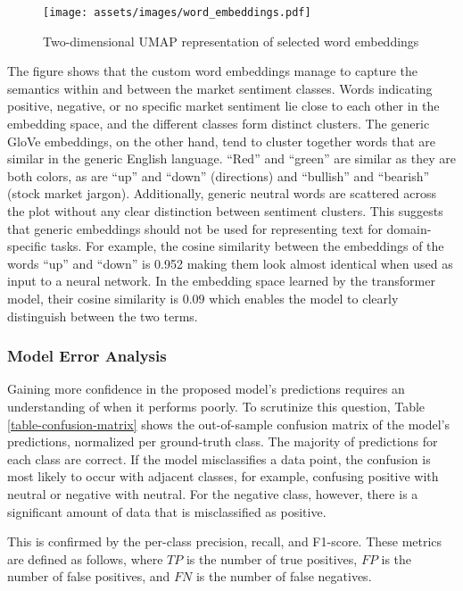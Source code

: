 \begin{figure}[!ht]
	\texttt{[image: assets/images/word\_embeddings.pdf]}
	\caption{Two-dimensional UMAP representation of selected word embeddings}
	\label{figure-tsne-word-embeddings}
\end{figure}

The figure shows that the custom word embeddings manage to capture the semantics within and between the market sentiment classes. Words indicating positive, negative, or no specific market sentiment lie close to each other in the embedding space, and the different classes form distinct clusters. The generic GloVe embeddings, on the other hand, tend to cluster together words that are similar in the generic English language. ``Red'' and ``green'' are similar as they are both colors, as are ``up'' and ``down'' (directions) and ``bullish'' and ``bearish'' (stock market jargon). Additionally, generic neutral words are scattered across the plot without any clear distinction between sentiment clusters. This suggests that generic embeddings should not be used for representing text for domain-specific tasks. For example, the cosine similarity between the embeddings of the words ``up'' and ``down'' is 0.952 making them look almost identical when used as input to a neural network. In the embedding space learned by the transformer model, their cosine similarity is $0.09$ which enables the model to clearly distinguish between the two terms.


\subsubsection{Model Error Analysis}

\label{section-model-error-analysis}
Gaining more confidence in the proposed model's predictions requires an understanding of when it performs poorly. To scrutinize this question, Table \ref{table-confusion-matrix} shows the out-of-sample confusion matrix of the model's predictions, normalized per ground-truth class. The majority of predictions for each class are correct. If the model misclassifies a data point, the confusion is most likely to occur with adjacent classes, for example, confusing positive with neutral or negative with neutral. For the negative class, however, there is a significant amount of data that is misclassified as positive.





This is confirmed by the per-class precision, recall, and F1-score. These metrics are defined as follows, where $TP$ is the number of true positives, $FP$ is the number of false positives, and $FN$ is the number of false negatives.

